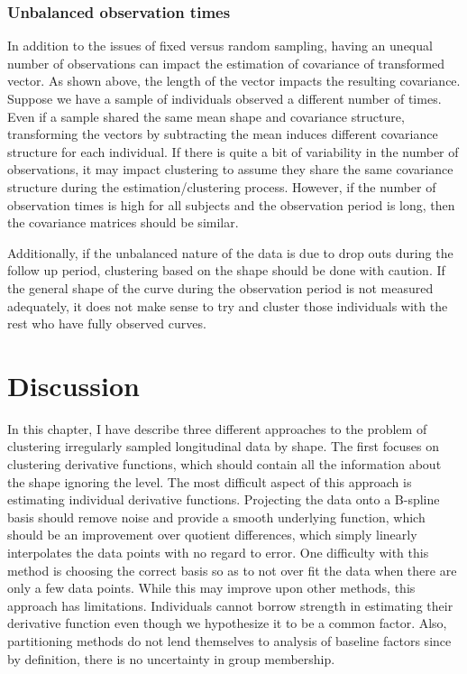 \subsubsection{Unbalanced observation times}
In addition to the issues of fixed versus random sampling, having an unequal number of observations can impact the estimation of covariance of transformed vector. As shown above, the length of the vector impacts the resulting covariance. Suppose we have a sample of individuals observed a different number of times. Even if a sample shared the same mean shape and covariance structure, transforming the vectors by subtracting the mean induces different covariance structure for each individual. If there is quite a bit of variability in the number of observations, it may impact clustering to assume they share the same covariance structure during the estimation/clustering process. However, if the number of observation times is high for all subjects and the observation period is long, then the covariance matrices should be similar. 

Additionally, if the unbalanced nature of the data is due to drop outs during the follow up period, clustering based on the shape should be done with caution. If the general shape of the curve during the observation period is not measured adequately, it does not make sense to try and cluster those individuals with the rest who have fully observed curves. 

\section{Discussion}
In this chapter, I have describe three different approaches to the problem of clustering irregularly sampled longitudinal data by shape. The first focuses on clustering derivative functions, which should contain all the information about the shape ignoring the level. The most difficult aspect of this approach is estimating individual derivative functions. Projecting the data onto a B-spline basis should remove noise and provide a smooth underlying function, which should be an improvement over quotient differences, which simply linearly interpolates the data points with no regard to error. One difficulty with this method is choosing the correct basis so as to not over fit the data when there are only a few data points. While this may improve upon other methods, this approach has limitations. Individuals cannot borrow strength in estimating their derivative function even though we hypothesize it to be a common factor. Also, partitioning methods do not lend themselves to analysis of baseline factors since by definition, there is no uncertainty in group membership.  

